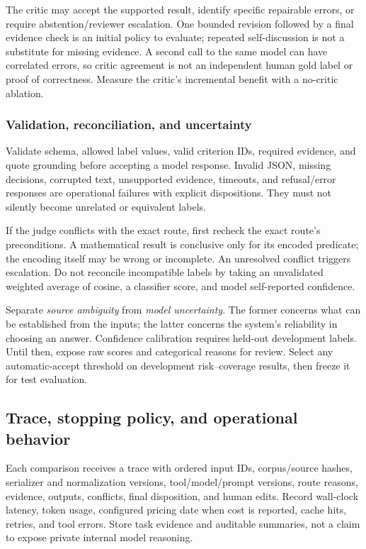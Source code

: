 \documentclass[10pt,letterpaper]{article}
\begin{document}
The critic may accept the supported result, identify specific repairable
errors, or require abstention/reviewer escalation. One bounded revision
followed by a final evidence check is an initial policy to evaluate; repeated
self-discussion is not a substitute for missing evidence. A second call to
the same model can have correlated errors, so critic agreement is not an
independent human gold label or proof of correctness. Measure the critic's
incremental benefit with a no-critic ablation.

\subsubsection{Validation, reconciliation, and uncertainty}
Validate schema, allowed label values, valid criterion IDs, required evidence,
and quote grounding before accepting a model response. Invalid JSON, missing
decisions, corrupted text, unsupported evidence, timeouts, and refusal/error
responses are operational failures with explicit dispositions. They must not
silently become unrelated or equivalent labels.

If the judge conflicts with the exact route, first recheck the exact route's
preconditions. A mathematical result is conclusive only for its encoded
predicate; the encoding itself may be wrong or incomplete. An unresolved
conflict triggers escalation. Do not reconcile incompatible labels by taking
an unvalidated weighted average of cosine, a classifier score, and model
self-reported confidence.

Separate \emph{source ambiguity} from \emph{model uncertainty}. The former
concerns what can be established from the inputs; the latter concerns the
system's reliability in choosing an answer. Confidence calibration requires
held-out development labels. Until then, expose raw scores and categorical
reasons for review. Select any automatic-accept threshold on development
risk--coverage results, then freeze it for test evaluation.

\subsection{Trace, stopping policy, and operational behavior}
Each comparison receives a trace with ordered input IDs, corpus/source hashes,
serializer and normalization versions, tool/model/prompt versions, route
reasons, evidence, outputs, conflicts, final disposition, and human edits.
Record wall-clock latency, token usage, configured pricing date when cost is
reported, cache hits, retries, and tool errors. Store task evidence and
auditable summaries, not a claim to expose private internal model reasoning.
\end{document}
